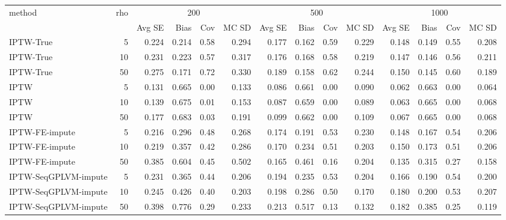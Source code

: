 \begin{tabular}{l r|rrrr|rrrr|rrrr}
\toprule
method & rho & \multicolumn{4}{c|}{200} & \multicolumn{4}{c|}{500} & \multicolumn{4}{c}{1000} \\
 &  & Avg SE & Bias & Cov & MC SD & Avg SE & Bias & Cov & MC SD & Avg SE & Bias & Cov & MC SD \\
\midrule
IPTW-True & 5 & 0.224 & 0.214 & 0.58 & 0.294 & 0.177 & 0.162 & 0.59 & 0.229 & 0.148 & 0.149 & 0.55 & 0.208 \\
IPTW-True & 10 & 0.231 & 0.223 & 0.57 & 0.317 & 0.176 & 0.168 & 0.58 & 0.219 & 0.147 & 0.146 & 0.56 & 0.211 \\
IPTW-True & 50 & 0.275 & 0.171 & 0.72 & 0.330 & 0.189 & 0.158 & 0.62 & 0.244 & 0.150 & 0.145 & 0.60 & 0.189 \\
IPTW & 5 & 0.131 & 0.665 & 0.00 & 0.133 & 0.086 & 0.661 & 0.00 & 0.090 & 0.062 & 0.663 & 0.00 & 0.064 \\
IPTW & 10 & 0.139 & 0.675 & 0.01 & 0.153 & 0.087 & 0.659 & 0.00 & 0.089 & 0.063 & 0.665 & 0.00 & 0.068 \\
IPTW & 50 & 0.177 & 0.683 & 0.03 & 0.191 & 0.099 & 0.662 & 0.00 & 0.109 & 0.067 & 0.665 & 0.00 & 0.068 \\
IPTW-FE-impute & 5 & 0.216 & 0.296 & 0.48 & 0.268 & 0.174 & 0.191 & 0.53 & 0.230 & 0.148 & 0.167 & 0.54 & 0.206 \\
IPTW-FE-impute & 10 & 0.219 & 0.357 & 0.42 & 0.286 & 0.170 & 0.234 & 0.51 & 0.203 & 0.150 & 0.173 & 0.51 & 0.206 \\
IPTW-FE-impute & 50 & 0.385 & 0.604 & 0.45 & 0.502 & 0.165 & 0.461 & 0.16 & 0.204 & 0.135 & 0.315 & 0.27 & 0.158 \\
IPTW-SeqGPLVM-impute & 5 & 0.231 & 0.365 & 0.44 & 0.206 & 0.194 & 0.235 & 0.53 & 0.204 & 0.166 & 0.190 & 0.54 & 0.200 \\
IPTW-SeqGPLVM-impute & 10 & 0.245 & 0.426 & 0.40 & 0.203 & 0.198 & 0.286 & 0.50 & 0.170 & 0.180 & 0.200 & 0.53 & 0.207 \\
IPTW-SeqGPLVM-impute & 50 & 0.398 & 0.776 & 0.29 & 0.233 & 0.213 & 0.517 & 0.13 & 0.132 & 0.182 & 0.385 & 0.25 & 0.119 \\
\bottomrule
\end{tabular}